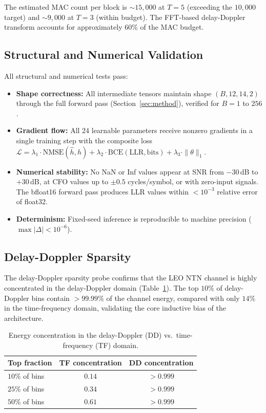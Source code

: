 \documentclass{article}
\begin{document}
The estimated MAC count per block is $\sim 15{,}000$ at $T=5$ (exceeding the $10{,}000$ target) and $\sim 9{,}000$ at $T=3$ (within budget). The FFT-based delay-Doppler transform accounts for approximately $60\%$ of the MAC budget. %

\subsection{Structural and Numerical Validation}

All structural and numerical tests pass:
\begin{itemize}
  \item \textbf{Shape correctness:} All intermediate tensors maintain shape $(B, 12, 14, 2)$ through the full forward pass (Section~\ref{sec:method}), verified for $B = 1$ to $256$.
  \item \textbf{Gradient flow:} All 24 learnable parameters receive nonzero gradients in a single training step with the composite loss $\mathcal{L} = \lambda_1 \cdot \mathrm{NMSE}(\hat{h}, h) + \lambda_2 \cdot \mathrm{BCE}(\mathrm{LLR}, \mathrm{bits}) + \lambda_3 \cdot \|\theta\|_1$.
  \item \textbf{Numerical stability:} No NaN or Inf values appear at SNR from $-30$\,dB to $+30$\,dB, at CFO values up to $\pm 0.5$ cycles/symbol, or with zero-input signals. The bfloat16 forward pass produces LLR values within $< 10^{-3}$ relative error of float32.
  \item \textbf{Determinism:} Fixed-seed inference is reproducible to machine precision ($\max|\Delta| < 10^{-6}$).
\end{itemize}

\subsection{Delay-Doppler Sparsity}

The delay-Doppler sparsity probe confirms that the LEO NTN channel is highly concentrated in the delay-Doppler domain (Table~\ref{tab:sparsity}). The top $10\%$ of delay-Doppler bins contain $> 99.99\%$ of the channel energy, compared with only $14\%$ in the time-frequency domain, validating the core inductive bias of the architecture.

\begin{table}[h]
  \centering
  \caption{Energy concentration in the delay-Doppler (DD) vs.\ time-frequency (TF) domain.}
  \label{tab:sparsity}
  \begin{tabular}{@{}lcc@{}}
    \toprule
    Top fraction & TF concentration & DD concentration \\
    \midrule
    $10\%$ of bins & $0.14$ & $> 0.999$ \\
    $25\%$ of bins & $0.34$ & $> 0.999$ \\
    $50\%$ of bins & $0.61$ & $> 0.999$ \\
    \bottomrule
  \end{tabular}
\end{table}
\end{document}
